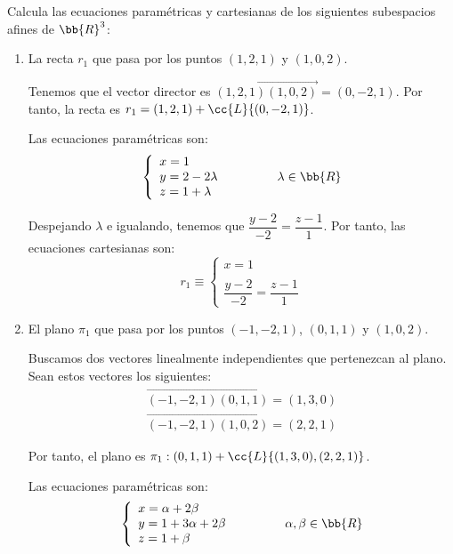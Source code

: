 \begin{ejercicio}
    Calcula las ecuaciones paramétricas y cartesianas de los siguientes subespacios afines de $\bb{R}^3$:
    \begin{enumerate}
        \item La recta $r_1$ que pasa por los puntos $(1, 2, 1)$ y $(1, 0, 2)$.

        Tenemos que el vector director es $\vec{(1,2,1)(1,0,2)}=(0,-2,1)$. Por tanto, la recta es $r_1=(1,2,1) + \cc{L}\{(0,-2,1)\}$.

        Las ecuaciones paramétricas son:
        \begin{equation*}
            \left\{
                \begin{array}{l}
                    x = 1 \\
                    y = 2-2\lambda \\
                    z = 1+\lambda
                \end{array}
            \right. \qquad\qquad \lambda\in \bb{R}
        \end{equation*}

        Despejando $\lambda$ e igualando, tenemos que $\dfrac{y-2}{-2}=\dfrac{z-1}{1}$. Por tanto, las ecuaciones cartesianas son:
        \begin{equation*}
            r_1\equiv \left\{
                \begin{array}{l}
                    x = 1 \\ \\
                    \dfrac{y-2}{-2}=\dfrac{z-1}{1}
                \end{array}
            \right.
        \end{equation*}
        
        \item El plano $\pi_1$ que pasa por los puntos $(-1, -2, 1)$, $(0, 1, 1)$ y $(1, 0, 2)$.

        Buscamos dos vectores linealmente independientes que pertenezcan al plano. Sean estos vectores los siguientes:
        \begin{gather*}
            \vec{(-1,-2,1)(0,1,1)} = (1,3,0) \\
            \vec{(-1,-2,1)(1,0,2)} = (2,2,1)
        \end{gather*}

        Por tanto, el plano es $\pi_1:(0,1,1) + \cc{L}\{(1,3,0),(2,2,1)\}$.

        Las ecuaciones paramétricas son:
        \begin{equation*}
            \left\{
                \begin{array}{l}
                    x = \alpha + 2\beta \\
                    y = 1+3\alpha +2\beta \\
                    z = 1+\beta
                \end{array}
            \right. \qquad\qquad \alpha,\beta\in \bb{R}
        \end{equation*}


\end{enumerate}
\end{ejercicio}

